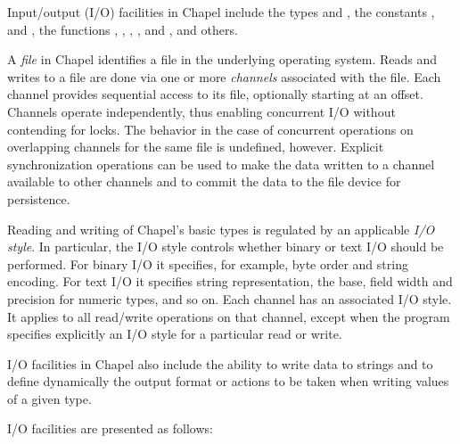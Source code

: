 \label{Input_and_Output}

Input/output (I/O) facilities in Chapel include
the types  and ,
the constants ,  and ,
the functions , , , ,
 and ,
and others.

A \emph{file} in Chapel identifies a file in the underlying operating system.
%
Reads and writes to a file are done via one or more \emph{channels}
associated with the file.
Each channel provides sequential access to its file, optionally
starting at an offset. Channels operate independently,
thus enabling concurrent I/O without contending for locks.
The behavior in the case of concurrent operations
on overlapping channels for the same file is undefined, however.
%
Explicit synchronization operations can be used
to make the data written to a channel available to other channels
and to commit the data to the file device for persistence.

Reading and writing of Chapel's basic types is regulated by
an applicable \emph{I/O style}.
In particular, the I/O style controls whether binary or text I/O
should be performed. For binary I/O it specifies, for example, byte order
and string encoding. For text I/O it specifies string representation,
the base, field width and precision for numeric types, and so on.
Each channel has an associated I/O style. It applies to
all read/write operations on that channel, except when the program
specifies explicitly an I/O style for a particular read or write.

I/O facilities in Chapel also include the ability to write data
to strings and to define dynamically the output format or actions
to be taken when writing values of a given type.

I/O facilities are presented as follows:

